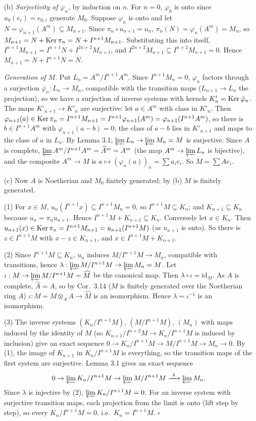 \documentclass[11pt]{article}
\begin{document}
(b) \emph{Surjectivity of $\varphi_n$,} by induction on $n$. For $n=0$, $\varphi_0$ is onto since $u_0(e_i)=e_{0,i}$ generate $M_0$. Suppose $\varphi_n$ is onto and let $N=\varphi_{n+1}(A^m)\subseteq M_{n+1}$. Since $\pi_n\circ u_{n+1}=u_n$, $\pi_n(N)=\varphi_n(A^m)=M_n$, so $M_{n+1}=N+\operatorname{Ker}\pi_n=N+I^{n+1}M_{n+1}$. Substituting this into itself, $I^{n+1}M_{n+1}=I^{n+1}N+I^{2n+2}M_{n+1}$, and $I^{2n+2}M_{n+1}\subseteq I^{n+2}M_{n+1}=0$. Hence $M_{n+1}=N+I^{n+1}N=N$.

\emph{Generation of $M$.} Put $L_n=A^m/I^{n+1}A^m$. Since $I^{n+1}M_n=0$, $\varphi_n$ factors through a surjection $\bar\varphi_n:L_n\to M_n$, compatible with the transition maps ($L_{n+1}\to L_n$ the projection), so we have a surjection of inverse systems with kernels $K'_n=\operatorname{Ker}\bar\varphi_n$. The maps $K'_{n+1}\to K'_n$ are surjective: let $a\in A^m$ with class in $K'_n$. Then $\varphi_{n+1}(a)\in\operatorname{Ker}\pi_n=I^{n+1}M_{n+1}=I^{n+1}\varphi_{n+1}(A^m)=\varphi_{n+1}(I^{n+1}A^m)$, so there is $b\in I^{n+1}A^m$ with $\varphi_{n+1}(a-b)=0$; the class of $a-b$ lies in $K'_{n+1}$ and maps to the class of $a$ in $L_n$. By Lemma 3.1, $\varprojlim L_n\to\varprojlim M_n=M$ is surjective. Since $A$ is complete, $\varprojlim A^m/I^{n+1}A^m=\widehat{A}^m=A^m$ (the map $A^m\to\varprojlim L_n$ is bijective), and the composite $A^m\to M$ is $a\mapsto(\varphi_n(a))_n=\sum a_ie_i$. So $M=\sum Ae_i$.

(c) Now $A$ is Noetherian and $M_0$ finitely generated; by (b) $M$ is finitely generated.

(1) For $x\in M$, $u_n(I^{n+1}x)\subseteq I^{n+1}M_n=0$, so $I^{n+1}M\subseteq K_n$; and $K_{n+1}\subseteq K_n$ because $u_n=\pi_nu_{n+1}$. Hence $I^{n+1}M+K_{n+1}\subseteq K_n$. Conversely let $x\in K_n$. Then $u_{n+1}(x)\in\operatorname{Ker}\pi_n=I^{n+1}M_{n+1}=u_{n+1}(I^{n+1}M)$ (as $u_{n+1}$ is onto). So there is $z\in I^{n+1}M$ with $x-z\in K_{n+1}$, and $x\in I^{n+1}M+K_{n+1}$.

(2) Since $I^{n+1}M\subseteq K_n$, $u_n$ induces $M/I^{n+1}M\to M_n$, compatible with transitions, hence $\lambda:\varprojlim M/I^{n+1}M\to\varprojlim M_n=M$. Let $\iota:M\to\varprojlim M/I^{n+1}M=\widehat{M}$ be the canonical map. Then $\lambda\circ\iota=\mathrm{id}_M$. As $A$ is complete, $\widehat{A}=A$, so by Cor.~3.14 ($M$ is finitely generated over the Noetherian ring $A$) $\iota:M=M\otimes_AA\to\widehat{M}$ is an isomorphism. Hence $\lambda=\iota^{-1}$ is an isomorphism.

(3) The inverse systems $(K_n/I^{n+1}M)$, $(M/I^{n+1}M)$, $(M_n)$ with maps induced by the identity of $M$ (so $K_{n+1}/I^{n+2}M\to K_n/I^{n+1}M$ is induced by inclusion) give an exact sequence $0\to K_n/I^{n+1}M\to M/I^{n+1}M\to M_n\to0$. By (1), the image of $K_{n+1}$ in $K_n/I^{n+1}M$ is everything, so the transition maps of the first system are surjective. Lemma 3.1 gives an exact sequence
\[ 0\to\varprojlim K_n/I^{n+1}M\to\varprojlim M/I^{n+1}M\xrightarrow{\ \lambda\ }\varprojlim M_n. \]
Since $\lambda$ is injective by (2), $\varprojlim K_n/I^{n+1}M=0$. For an inverse system with surjective transition maps, each projection from the limit is onto (lift step by step), so every $K_n/I^{n+1}M=0$, i.e.\ $K_n=I^{n+1}M$. \hfill$\square$
\end{document}
